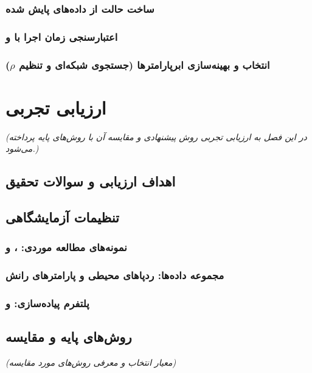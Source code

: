 \documentclass[12pt,a4paper]{report} %
\begin{document}
\subsection{ساخت حالت از داده‌های پایش شده}
\subsection{اعتبارسنجی زمان اجرا با  و }
\subsection{انتخاب و بهینه‌سازی ابرپارامترها (جستجوی شبکه‌ای و تنظیم \texorpdfstring{$\rho$}{ρ})}

\newpage

\chapter{ارزیابی تجربی}
\textit{(در این فصل به ارزیابی تجربی روش پیشنهادی و مقایسه آن با روش‌های پایه پرداخته می‌شود.)}

\section{اهداف ارزیابی و سوالات تحقیق}

\section{تنظیمات آزمایشگاهی}
\subsection{نمونه‌های مطالعه موردی: ،  و }
\subsection{مجموعه داده‌ها: ردپاهای محیطی و پارامترهای رانش}
\subsection{پلتفرم پیاده‌سازی:  و }

\section{روش‌های پایه و مقایسه}
\textit{(معیار انتخاب و معرفی روش‌های مورد مقایسه)}
\end{document}
